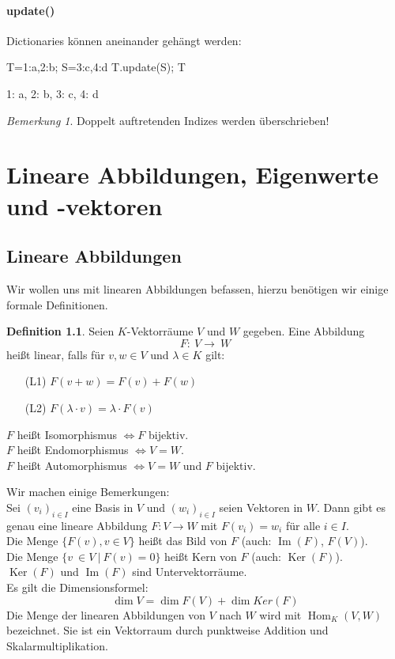 \documentclass[fontsize=12pt,paper=a4,twoside,bibtotoc,idxtotoc,
liststotoc,pagesize,BCOR1.2cm,DIV15,chapterprefix,pagesize=pdftex]{scrbook}
\theoremstyle{plain}
\theoremstyle{definition}
\newtheorem{df}[equation]{Definition}
\theoremstyle{remark}
\newtheorem{bem}[equation]{Bemerkung}
\begin{document}
\subsubsection{update()}
Dictionaries können aneinander gehängt werden:
\begin{sagein}
T={1:a,2:b}; S={3:c,4:d}
T.update(S); T
\end{sagein}
\begin{sageout}
{1: a, 2: b, 3: c, 4: d}
\end{sageout}
\begin{bem}
Doppelt auftretenden Indizes werden überschrieben!
\end{bem}
\chapter{Lineare Abbildungen, Eigenwerte und -vektoren}
\section{Lineare Abbildungen}
Wir wollen uns mit linearen Abbildungen befassen, hierzu benötigen wir einige formale Definitionen.
\begin{df}
Seien $K$-Vektorräume $V$ und $W$ gegeben. Eine Abbildung
\[ F: \ V \rightarrow \ W \]
heißt linear, falls für $v,w\in V$ und $\lambda \in K$ gilt:
\begin{itemize}
 \item[(L1)] $F(v+w)=F(v)+F(w)$
 \item[(L2)] $F(\lambda \cdot v)=\lambda \cdot F(v)$
\end{itemize} 
$F$ heißt Isomorphismus $\Longleftrightarrow F$ bijektiv.\\
$F$ heißt Endomorphismus $\Longleftrightarrow V=W$.\\
$F$ heißt Automorphismus $\Longleftrightarrow V=W$ und $F$ bijektiv.
\end{df}
Wir machen einige Bemerkungen:\\
Sei $(v_i)_{i\in I}$ eine Basis in $V$ und $(w_i)_{i\in I}$
seien Vektoren in $W$. Dann gibt es genau eine lineare Abbildung $F:V
\rightarrow W$ mit $F(v_i)=w_i$ für alle $i \in I$.\\
Die Menge $\{ F(v), v \in V \}$ heißt das Bild von $F$ (auch: $\mathop{Im}(F)$, $F(V)$).\\
Die Menge $\{v \ \in V \ | \ F(v)=0 \}$ heißt Kern von $F$ (auch: $\mathop{Ker}(F)$).\\
$\mathop{Ker}(F)$ und $\mathop{Im}(F)$ sind Untervektorräume.\\
Es gilt die Dimensionsformel:
\[\dim V = \dim F(V) + \dim Ker(F)\]
Die Menge der linearen Abbildungen von $V$ nach $W$ wird mit $\operatorname{Hom}_K(V,W)$ bezeichnet. 
Sie ist ein Vektorraum durch punktweise Addition und Skalarmultiplikation.
\end{document}
